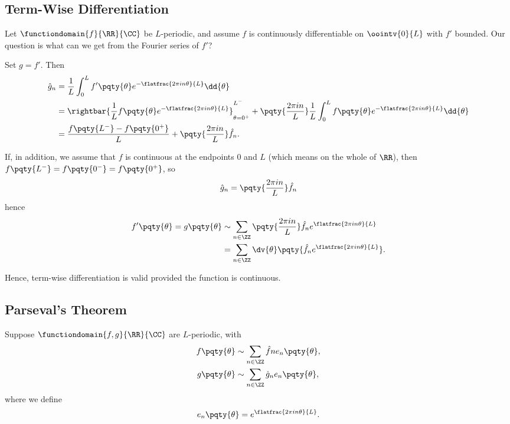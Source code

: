 \subsection{Term-Wise Differentiation}

Let \(\functiondomain{f}{\RR}{\CC}\) be \(L\)-periodic, and assume \(f\) is continuously differentiable on \(\oointv{0}{L}\) with \(f'\) bounded. Our question is what can we get from the Fourier series of \(f'\)?

Set \(g = f'\). Then
\begin{subequations}
    \begin{align}
        \hat{g}_n &= \frac{1}{L} \int_{0}^{L} f'\pqty{\theta} e^{-\flatfrac{2 \pi i n \theta}{L}} \dd{\theta} \\
        &= \rightbar{\frac{1}{L} f\pqty{\theta} e^{- \flatfrac{2 \pi i n \theta}{L}}}_{\theta = 0^+}^{L^-} + \pqty{\frac{2 \pi i n}{L}} \frac{1}{L} \int_{0}^{L} f\pqty{\theta} e^{- \flatfrac{2 \pi i n \theta}{L}} \dd{\theta} \\
        &= \frac{f\pqty{L^-} - f\pqty{0^+}}{L} + \pqty{\frac{2 \pi i n}{L}} \hat{f}_n.
    \end{align}
\end{subequations}

If, in addition, we assume that \(f\) is continuous at the endpoints \(0\) and \(L\) (which means on the whole of \(\RR\)), then \(f\pqty{L^-} = f\pqty{0^-} = f\pqty{0^+}\), so
\begin{equation}
    \hat{g}_n = \pqty{\frac{2 \pi i n}{L}} \hat{f}_n
\end{equation}
hence
\begin{subequations}
    \begin{align}
        f'\pqty{\theta} = g\pqty{\theta} &\sim \sum_{n \in \ZZ} \pqty{\frac{2 \pi i n}{L}} \hat{f}_n e^{\flatfrac{2 \pi i n \theta}{L}} \\
        &= \sum_{n \in \ZZ} \dv{\theta} \pqty{\hat{f}_n e^{\flatfrac{2 \pi i n \theta}{L}}}. 
    \end{align}
\end{subequations}

Hence, term-wise differentiation is valid provided the function is continuous.

\subsection{Parseval's Theorem}

Suppose \(\functiondomain{f, g}{\RR}{\CC}\) are \(L\)-periodic, with
\begin{subequations}
    \begin{align}
        f\pqty{\theta} &\sim \sum_{n \in \ZZ} \hat{f}n e_n\pqty{\theta}, \\
        g\pqty{\theta} &\sim \sum_{n \in \ZZ} \hat{g}_n e_n\pqty{\theta},
    \end{align}
\end{subequations}
where we define
\begin{equation}
    e_n\pqty{\theta} = e^{\flatfrac{2 \pi i n \theta}{L}}.
\end{equation}

